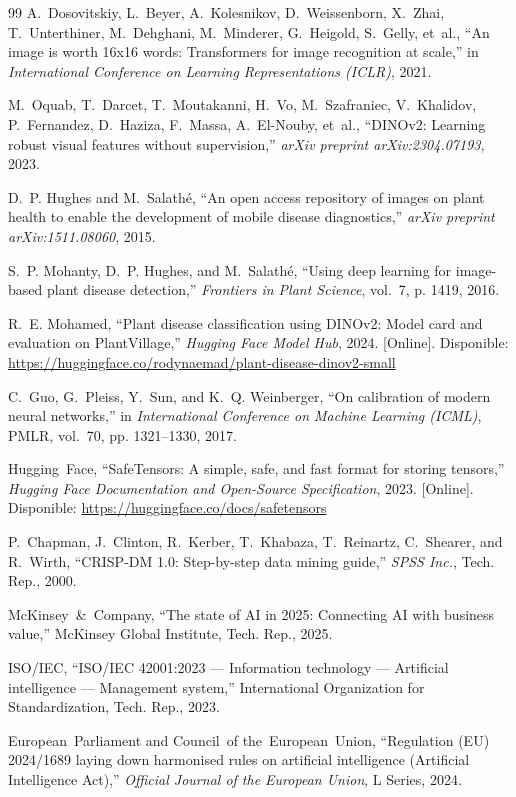 \documentclass[12pt,letterpaper]{article}
\begin{document}
\begin{thebibliography}{99}
A.~Dosovitskiy, L.~Beyer, A.~Kolesnikov, D.~Weissenborn, X.~Zhai, T.~Unterthiner, M.~Dehghani, M.~Minderer, G.~Heigold, S.~Gelly, et~al., ``An image is worth 16x16 words: Transformers for image recognition at scale,'' in \emph{International Conference on Learning Representations (ICLR)}, 2021.

M.~Oquab, T.~Darcet, T.~Moutakanni, H.~Vo, M.~Szafraniec, V.~Khalidov, P.~Fernandez, D.~Haziza, F.~Massa, A.~El-Nouby, et~al., ``DINOv2: Learning robust visual features without supervision,'' \emph{arXiv preprint arXiv:2304.07193}, 2023.

D.~P. Hughes and M.~Salath{\'e}, ``An open access repository of images on plant health to enable the development of mobile disease diagnostics,'' \emph{arXiv preprint arXiv:1511.08060}, 2015.

S.~P. Mohanty, D.~P. Hughes, and M.~Salath{\'e}, ``Using deep learning for image-based plant disease detection,'' \emph{Frontiers in Plant Science}, vol.~7, p. 1419, 2016.

R.~E. Mohamed, ``Plant disease classification using DINOv2: Model card and evaluation on PlantVillage,'' \emph{Hugging Face Model Hub}, 2024. [Online]. Disponible: \url{https://huggingface.co/rodynaemad/plant-disease-dinov2-small}

C.~Guo, G.~Pleiss, Y.~Sun, and K.~Q. Weinberger, ``On calibration of modern neural networks,'' in \emph{International Conference on Machine Learning (ICML)}, PMLR, vol.~70, pp. 1321--1330, 2017.

Hugging~Face, ``SafeTensors: A simple, safe, and fast format for storing tensors,'' \emph{Hugging Face Documentation and Open-Source Specification}, 2023. [Online]. Disponible: \url{https://huggingface.co/docs/safetensors}

P.~Chapman, J.~Clinton, R.~Kerber, T.~Khabaza, T.~Reinartz, C.~Shearer, and R.~Wirth, ``CRISP-DM 1.0: Step-by-step data mining guide,'' \emph{SPSS Inc.}, Tech. Rep., 2000.

McKinsey~\&~Company, ``The state of AI in 2025: Connecting AI with business value,'' McKinsey Global Institute, Tech. Rep., 2025.

ISO/IEC, ``ISO/IEC 42001:2023 --- Information technology --- Artificial intelligence --- Management system,'' International Organization for Standardization, Tech. Rep., 2023.

European~Parliament and Council~of the~European~Union, ``Regulation (EU) 2024/1689 laying down harmonised rules on artificial intelligence (Artificial Intelligence Act),'' \emph{Official Journal of the European Union}, L Series, 2024.
\end{thebibliography}
\end{document}
